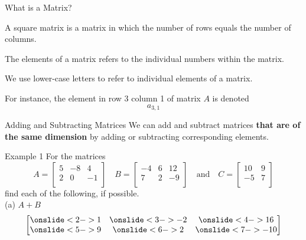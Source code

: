 \documentclass[t]{beamer}
\begin{document}
\begin{frame}{What is a Matrix?}
\begin{tcolorbox}[colback=red!20!white, colframe=red!30!black, title=\textbf{Square Matrix}]
A square matrix is a matrix in which the number of rows equals the number of columns.
\end{tcolorbox}
\vspace{8pt} \pause

\begin{tcolorbox}[colback=red!20!white, colframe=red!30!black, title=\textbf{Matrix Elements}]
The elements of a matrix refers to the individual numbers within the matrix.
\end{tcolorbox}
\vspace{8pt}	\pause

We use lower-case letters to refer to individual elements of a matrix. \newline\\ \pause

For instance, the element in row 3 column 1 of matrix $A$ is denoted \[a_{3,1}\]
\end{frame}

\begin{frame}{Adding and Subtracting Matrices}
We can add and subtract matrices {\color{blue}\textbf{that are of the same dimension}} by adding or subtracting corresponding elements.
\end{frame}

\begin{frame}{Example 1}
For the matrices 
\[
A =
\begin{bmatrix}
5   &   -8  &   4   \\
2   &   0   &   -1  \\
\end{bmatrix}
\quad 
B = 
\begin{bmatrix}
-4  &   6   &   12  \\
7   &   2   &   -9  \\
\end{bmatrix}
\quad   \text{and}  \quad
C =
\begin{bmatrix}
10  &   9   \\
-5  &   7   \\
\end{bmatrix}
\]
find each of the following, if possible.	\newline\\
(a) \quad $A + B$
\[
\begin{bmatrix}
\onslide<2->{1} & \onslide<3->{-2} & \onslide<4->{16} \\
\onslide<5->{9} & \onslide<6->{2} & \onslide<7->{-10} \\
\end{bmatrix}
\]
\end{frame}
\end{document}
